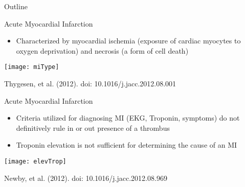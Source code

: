 \documentclass[xcolor=dvipsnames]{beamer}
\begin{document}
\begin{frame}{Outline}
\vspace{-10.5pt}
\tableofcontents[currentsection,subsectionstyle=show/shaded/hide]
\end{frame}

\begin{frame}{Acute Myocardial Infarction}
\vspace{-5pt}
\begin{itemize}
\item Characterized by myocardial ischemia (exposure of cardiac myocytes to oxygen deprivation) and necrosis (a form of cell death)
\end{itemize}
\begin{center}
\texttt{[image: miType]}

Thygesen, et al. (2012). doi: 10.1016/j.jacc.2012.08.001
\end{center}
\end{frame}

\begin{frame}{Acute Myocardial Infarction}
\vspace{-5pt}
\begin{itemize}
\item Criteria utilized for diagnosing MI (EKG, Troponin, symptoms) do not definitively rule in or out presence of a thrombus \pause
\item Troponin elevation is not sufficient for determining the cause of an MI \pause
\end{itemize}
\begin{center}
\texttt{[image: elevTrop]}

Newby, et al. (2012). doi: 10.1016/j.jacc.2012.08.969
\end{center}
\end{frame}
\end{document}
